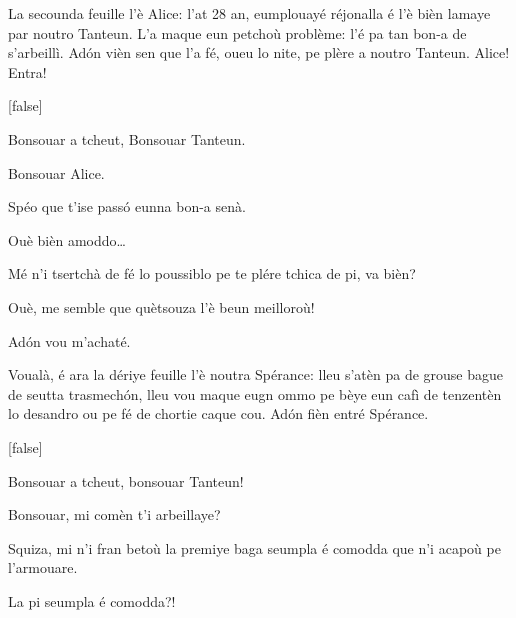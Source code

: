 \begin{drama}

\Mariespeaks La secounda feuille l'è Alice: l'at 28 an, eumplouayé réjonalla é l'è bièn lamaye par noutro Tanteun. L'a maque eun petchoù problème: l'é pa tan bon-a de s'arbeillì. Ad\'on vièn sen que l'a fé, oueu lo nite, pe plère a noutro Tanteun. Alice! Entra!

[false]%


\Alicespeaks {} Bonsouar a tcheut, Bonsouar Tanteun. 

\Tanteunspeaks Bonsouar Alice.

\Alicespeaks Spéo que t'ise pass\'o eunna bon-a senà.

\Tanteunspeaks Ouè bièn amoddo\ldots

\Alicespeaks Mé n'i tsertchà de fé lo poussiblo pe te plére tchica de pi, va bièn?

\Tanteunspeaks{} Ouè, me semble que quètsouza l'è beun meilloroù!

\Alicespeaks Ad\'on vou m'achaté.


\Mariespeaks{} Voualà, é ara la dériye feuille l'è noutra Spérance: lleu s'atèn pa de grouse bague de seutta trasmech\'on,  lleu vou maque eugn ommo pe bèye eun cafì de tenzentèn lo desandro ou pe fé de chortie caque cou. Ad\'on fièn entré Spérance.

[false]%


\Sperancespeaks Bonsouar a tcheut, bonsouar Tanteun!

\Tanteunspeaks{} Bonsouar, mi comèn t'i ar\-be\-illaye?

\Sperancespeaks Squiza, mi n'i fran betoù la premiye baga seumpla é comodda que n'i acapoù pe l'armouare.

\Tanteunspeaks La pi seumpla é comodda?!


\end{drama}
